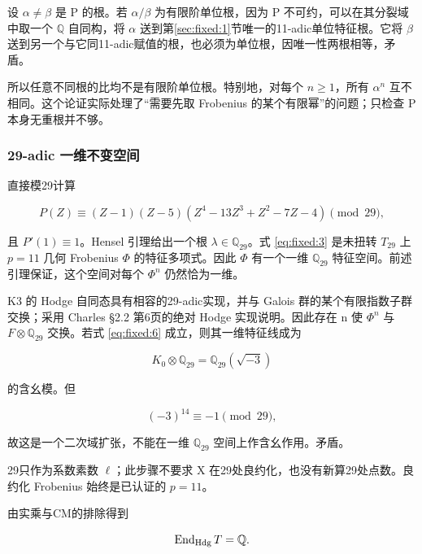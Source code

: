 \documentclass[11pt,a4paper,oneside]{ctexart}
\theoremstyle{cnplain}
\theoremstyle{definition}
\theoremstyle{remark}
\numberwithin{equation}{section}
\begin{document}
设 \(\alpha\ne\beta\) 是 P 的根。若 \(\alpha/\beta\) 为有限阶单位根，因为 P 不可约，可以在其分裂域中取一个 \(\mathbb Q\) 自同构，将 \(\alpha\) 送到第\ref{sec:fixed:1}节唯一的11-adic单位特征根。它将 \(\beta\) 送到另一个与它同11-adic赋值的根，也必须为单位根，因唯一性两根相等，矛盾。

所以任意不同根的比均不是有限阶单位根。特别地，对每个 \(n\ge1\)，所有 \(\alpha^n\) 互不相同。这个论证实际处理了``需要先取 Frobenius 的某个有限幂''的问题；只检查 P 本身无重根并不够。

\subsubsection{29-adic 一维不变空间}\label{sec:fixed:29}

直接模29计算

\begin{equation}
P(Z)\equiv(Z-1)(Z-5)(Z^4-13Z^3+Z^2-7Z-4)\pmod {29},            \label{eq:fixed:7}
\end{equation}

且 \(P'(1)\equiv1\)。Hensel 引理给出一个根 \(\lambda\in\mathbb Q_{29}\)。式 \eqref{eq:fixed:3} 是未扭转 \(T_{29}\) 上 \(p=11\) 几何 Frobenius \(\Phi\) 的特征多项式。因此 \(\Phi\) 有一个一维 \(\mathbb Q_{29}\) 特征空间。前述引理保证，这个空间对每个 \(\Phi^n\) 仍然恰为一维。

K3 的 Hodge 自同态具有相容的29-adic实现，并与 Galois 群的某个有限指数子群交换；采用 Charles §2.2 第6页的绝对 Hodge 实现说明。因此存在 n 使 \(\Phi^n\) 与 \(F\otimes\mathbb Q_{29}\) 交换。若式 \eqref{eq:fixed:6} 成立，则其一维特征线成为

\begin{equation}
K_0\otimes\mathbb Q_{29}=\mathbb Q_{29}(\sqrt{-3})
\end{equation}

的含幺模。但

\begin{equation}
(-3)^{14}\equiv-1\pmod {29},
\end{equation}

故这是一个二次域扩张，不能在一维 \(\mathbb Q_{29}\) 空间上作含幺作用。矛盾。

29只作为系数素数 \(\ell\)；此步骤不要求 X 在29处良约化，也没有新算29处点数。良约化 Frobenius 始终是已认证的 \(p=11\)。

由实乘与CM的排除得到

\begin{equation}
\operatorname{End}_{\rm Hdg}T=\mathbb Q.
                                                                    \label{eq:fixed:8}
\end{equation}
\end{document}
